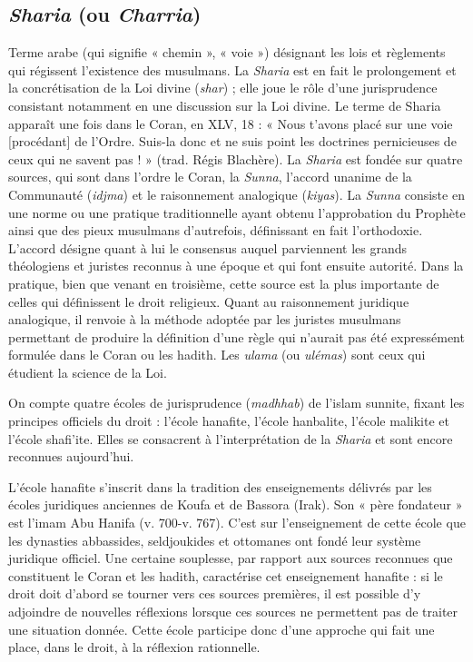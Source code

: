 \subsection{{\it Sharia} (ou {\it Charria})}
Terme arabe (qui
signifie « chemin », « voie ») désignant les
lois et règlements qui régissent l’existence
des musulmans. La {\it Sharia} est en fait le
prolongement et la concrétisation de la
Loi divine ({\it shar}) ; elle joue le rôle d’une
jurisprudence consistant notamment en
une discussion sur la Loi divine. Le terme
de Sharia apparaît une fois dans le Coran,
en XLV, 18 : « Nous t’avons placé sur une
voie [procédant] de l'Ordre. Suis-la donc
et ne suis point les doctrines pernicieuses
de ceux qui ne savent pas ! » (trad. Régis
Blachère). La {\it Sharia} est fondée sur
quatre sources, qui sont dans l’ordre le
Coran, la {\it Sunna}, l'accord unanime de la
Communauté ({\it idjma}) et le raisonnement
analogique ({\it kiyas}). La {\it Sunna} consiste en
une norme ou une pratique traditionnelle
ayant obtenu l’approbation du Prophète
ainsi que des pieux musulmans d’autrefois,
définissant en fait l’orthodoxie. L’accord
désigne quant à lui le consensus
auquel parviennent les grands théologiens
et juristes reconnus à une époque et qui
font ensuite autorité. Dans la pratique,
bien que venant en troisième, cette source
est la plus importante de celles qui définissent
le droit religieux. Quant au raisonnement
juridique analogique, il renvoie à
la méthode adoptée par les juristes musulmans
permettant de produire la définition
d’une règle qui n’aurait pas été expressément
formulée dans le Coran ou les
hadith. Les {\it ulama} (ou {\it ulémas}) sont ceux
qui étudient la science de la Loi.

On compte quatre écoles de jurisprudence
({\it madhhab}) de l'islam sunnite,
fixant les principes officiels du droit :
l’école hanafite, l’école hanbalite, l’école
malikite et l’école shafi’ite. Elles se consacrent
à l'interprétation de la {\it Sharia} et
sont encore reconnues aujourd’hui.

L'école hanafite s’inscrit dans la tradition
des enseignements délivrés par les
écoles juridiques anciennes de Koufa et
de Bassora (Irak). Son « père fondateur »
est l’imam Abu Hanifa (v. 700-v. 767).
C’est sur l’enseignement de cette école
que les dynasties abbassides, seldjoukides
et ottomanes ont fondé leur système juridique
officiel. Une certaine souplesse, par
rapport aux sources reconnues que constituent
le Coran et les hadith, caractérise
cet enseignement hanafite : si le droit doit
d’abord se tourner vers ces sources premières,
il est possible d’y adjoindre de
nouvelles réflexions lorsque ces sources
ne permettent pas de traiter une situation
donnée. Cette école participe donc d’une
approche qui fait une place, dans le droit,
à la réflexion rationnelle.


